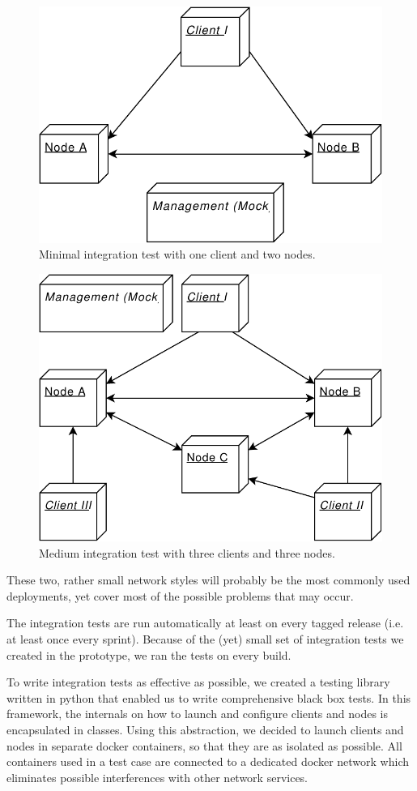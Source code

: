 \begin{figure}
	\centering
	\includegraphics[width=0.5\linewidth]{resources/integration_test_small}
	\caption[Minimal integration test]{Minimal integration test with one client and two nodes.}
	\label{fig:integrationtestsmall}
\end{figure}

\begin{figure}
	\centering
	\includegraphics[width=0.5\linewidth]{resources/integration_test_medium}
	\caption[Medium integration test]{Medium integration test with three clients and three nodes.}
	\label{fig:integrationtestmedium}
\end{figure}

These two, rather small network styles will probably be the most commonly used deployments, yet cover most of the possible problems that may occur.

The integration tests are run automatically at least on every tagged release (i.e. at least once every sprint). Because of the (yet) small set of integration tests we created in the prototype, we ran the tests on every build.

To write integration tests as effective as possible, we created a testing library written in python that enabled us to write comprehensive black box tests. In this framework, the internals on how to launch and configure clients and nodes is encapsulated in classes. Using this abstraction, we decided to launch clients and nodes in separate docker containers, so that they are as isolated as possible. All containers used in a test case are connected to a dedicated docker network which eliminates possible interferences with other network services.

